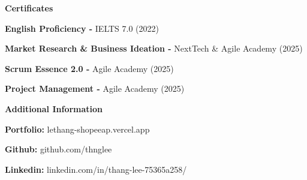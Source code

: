 \documentclass[11pt]{article}
\begin{document}
\vspace{12pt}


\begin{center}
    \textbf{Certificates}
\end{center}

\textbf{English Proficiency -} IELTS 7.0 (2022)

\textbf{Market Research \& Business Ideation -} NextTech \& Agile Academy (2025)

\textbf{Scrum Essence 2.0 -} Agile Academy (2025)

\textbf{Project Management -} Agile Academy (2025)

\vspace{12pt}
\begin{center}
    \textbf{Additional Information}
\end{center}
\textbf{Portfolio:} lethang-shopeeap.vercel.app

\textbf{Github:} github.com/thnglee

\textbf{Linkedin:} linkedin.com/in/thang-lee-75365a258/
\end{document}
